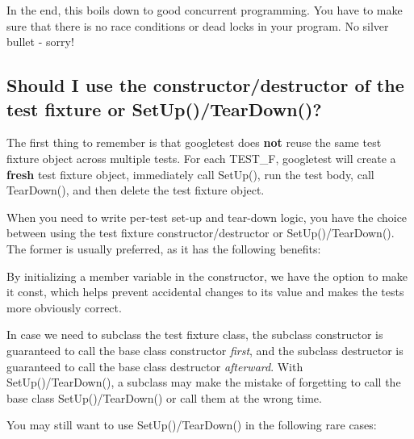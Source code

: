 In the end, this boils down to good concurrent programming. You have to make sure that there is no race conditions or dead locks in your program. No silver bullet -\/ sorry!

\subsection*{Should I use the constructor/destructor of the test fixture or Set\+Up()/\+Tear\+Down()?}

The first thing to remember is that googletest does {\bfseries{not}} reuse the same test fixture object across multiple tests. For each {\ttfamily T\+E\+S\+T\+\_\+F}, googletest will create a {\bfseries{fresh}} test fixture object, immediately call {\ttfamily Set\+Up()}, run the test body, call {\ttfamily Tear\+Down()}, and then delete the test fixture object.

When you need to write per-\/test set-\/up and tear-\/down logic, you have the choice between using the test fixture constructor/destructor or {\ttfamily Set\+Up()/\+Tear\+Down()}. The former is usually preferred, as it has the following benefits\+:


\begin{DoxyItemize}
\item By initializing a member variable in the constructor, we have the option to make it {\ttfamily const}, which helps prevent accidental changes to its value and makes the tests more obviously correct.
\item In case we need to subclass the test fixture class, the subclass\textquotesingle{} constructor is guaranteed to call the base class\textquotesingle{} constructor {\itshape first}, and the subclass\textquotesingle{} destructor is guaranteed to call the base class\textquotesingle{} destructor {\itshape afterward}. With {\ttfamily Set\+Up()/\+Tear\+Down()}, a subclass may make the mistake of forgetting to call the base class\textquotesingle{} {\ttfamily Set\+Up()/\+Tear\+Down()} or call them at the wrong time.
\end{DoxyItemize}

You may still want to use {\ttfamily Set\+Up()/\+Tear\+Down()} in the following rare cases\+:


